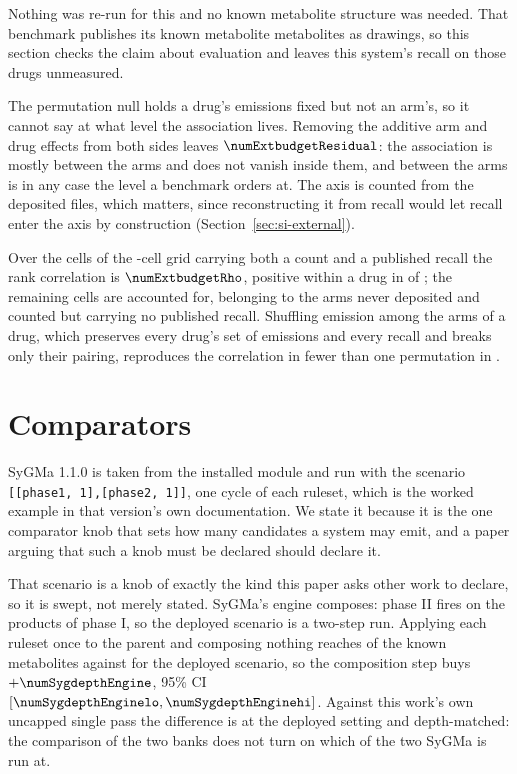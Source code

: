 \documentclass[journal=jcisd8,manuscript=suppinfo,layout=onecolumn]{achemso}
\begin{document}
Nothing was re-run for this and no known metabolite structure was needed. That benchmark publishes its
known metabolite metabolites as drawings, so this section checks the claim about evaluation and leaves
this system's recall on those drugs unmeasured.


The permutation null holds a drug's emissions fixed but not an arm's, so it cannot say at what level
the
association lives. Removing the additive arm and drug effects from both sides leaves
$\numExtbudgetResidual$: the association is mostly between the arms and does not vanish inside
them, and between the arms is in any case the level a benchmark orders at. The axis is counted from
the deposited files, which matters, since reconstructing it from recall would let recall enter the
axis by construction (Section~\ref{sec:si-external}).

Over the
\numExtbudgetCountedcells{} cells of the \numExtbudgetGrid{}-cell grid carrying both a count and a
published recall the rank correlation is $\numExtbudgetRho$, positive within a drug in
\numExtbudgetWithinpositive{} of \numExtbudgetWithinn{}; the remaining cells are accounted for,
\numExtbudgetAbsentnodeposit{} belonging to the \numExtbudgetArmsnotdepositedWord{} arms never
deposited and \numExtbudgetAbsentnorecallWord{} counted but carrying no published recall. Shuffling
emission among the arms of a drug, which preserves every drug's set of emissions and every recall
and breaks only their pairing, reproduces the correlation in fewer than one permutation in
\numExtbudgetPermutations{}.
\section{Comparators}
\label{sec:si-comparators}

SyGMa 1.1.0 is taken from the installed module and run with the scenario
\texttt{[[phase1,\,1],}\allowbreak\texttt{[phase2,\,1]]}, one cycle of each ruleset, which is
the worked example in that version's own documentation. We state it because it is the one comparator
knob that sets how many candidates a
system may emit, and a paper arguing that such a knob must be declared should declare it.

That scenario is a knob of exactly the kind this paper asks other work to declare, so it is swept,
not merely stated. SyGMa's engine composes: phase II fires on the products of phase I, so the
deployed scenario is a two-step run. Applying each ruleset once to the parent and composing nothing
reaches \numSygdepthOncepass{} of the known metabolites against \numSygdepthDeployed{} for the deployed
scenario, so the composition step buys $+\numSygdepthEngine$, 95\% CI $[\numSygdepthEnginelo,
\numSygdepthEnginehi]$. Against this work's own uncapped single pass the difference is
\numSygdepthGapdeployed{} at the deployed setting and \numSygdepthGapmatched{} depth-matched: the
comparison of the two banks does not turn on which of the two SyGMa is run at.
\end{document}
